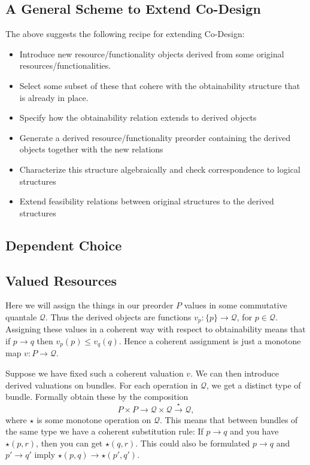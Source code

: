 \documentclass[12pt]{article}
\theoremstyle{definition}
\theoremstyle{plain}
\theoremstyle{plain}
\theoremstyle{plain}
\theoremstyle{plain}
\theoremstyle{remark}
\theoremstyle{remark}
\newcommand{\mc}[1]{\mathcal{#1}}
\begin{document}
\subsection{A General Scheme to Extend Co-Design}

The above suggests the following recipe for extending Co-Design:
\begin{itemize}
	\item Introduce new resource/functionality objects derived from some original resources/functionalities. 
	\item Select some subset of these that cohere with the obtainability structure that is already in place.
	\item Specify how the obtainability relation extends to derived objects
	\item Generate a derived resource/functionality preorder containing the derived objects together with the new relations
	\item Characterize this structure algebraically and check correspondence to logical structures
	\item Extend feasibility relations between original structures to the derived structures
\end{itemize}

\subsection{Dependent Choice}


\subsection{Valued Resources}
Here we will assign the things in our preorder $P$ values in some commutative quantale $\mathcal{Q}$. Thus the derived objects are functions $v_p:\{p\} \rightarrow \mathcal{Q}$, for $p \in \mathcal{Q}$. Assigning these values in a coherent way with respect to obtainability means that if $p \rightarrow q$ then $v_p(p) \leq v_q(q)$. Hence a coherent assignment is just a monotone map $v: P \rightarrow \mathcal{Q}$.

Suppose we have fixed such a coherent valuation $v$. We can then introduce derived valuations on bundles. For each operation in $\mathcal{Q}$, we get a distinct type of bundle. Formally obtain these by the composition
$$P \times P \rightarrow \mc{Q} \times \mc{Q} \stackrel{\star}{\rightarrow} \mc{Q},$$
where $\star$ is some monotone operation on $\mc{Q}$. This means that between bundles of the same type we have a coherent substitution rule: If $p \rightarrow q$ and you have $\star(p,r)$, then you can get $\star(q,r)$. This could also be formulated $p \rightarrow q$ and $p' \rightarrow q'$ imply $\star(p,q) \rightarrow \star(p',q')$.
\end{document}
